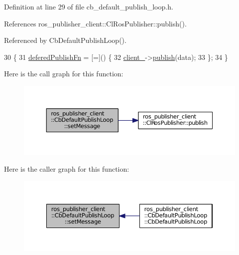 Definition at line 29 of file cb\+\_\+default\+\_\+publish\+\_\+loop.\+h.



References ros\+\_\+publisher\+\_\+client\+::\+Cl\+Ros\+Publisher\+::publish().



Referenced by Cb\+Default\+Publish\+Loop().


\begin{DoxyCode}
30     \{
31         \hyperlink{classros__publisher__client_1_1CbDefaultPublishLoop_a321f79f015449668a184cd30b6c2ad51}{deferedPublishFn} = [=]() \{
32             \hyperlink{classros__publisher__client_1_1CbDefaultPublishLoop_a90fc344876c742774a73542e338c3bfd}{client\_}->\hyperlink{classros__publisher__client_1_1ClRosPublisher_a9e62a3581a730cd2e287e560d04d151b}{publish}(data);
33         \};
34     \}
\end{DoxyCode}


Here is the call graph for this function\+:
\nopagebreak
\begin{figure}[H]
\begin{center}
\leavevmode
\includegraphics[width=350pt]{classros__publisher__client_1_1CbDefaultPublishLoop_a8bba9039f6a6841c21e9bc89c2fd8ab7_cgraph}
\end{center}
\end{figure}




Here is the caller graph for this function\+:
\nopagebreak
\begin{figure}[H]
\begin{center}
\leavevmode
\includegraphics[width=350pt]{classros__publisher__client_1_1CbDefaultPublishLoop_a8bba9039f6a6841c21e9bc89c2fd8ab7_icgraph}
\end{center}
\end{figure}


